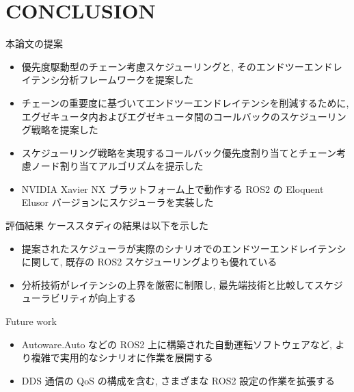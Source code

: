 
\section{CONCLUSION}
\label{sec: conslusion}

\begin{frame}{本論文の提案}
    \begin{itemize}
        \item 優先度駆動型のチェーン考慮スケジューリングと, そのエンドツーエンドレイテンシ分析フレームワークを提案した
        \item チェーンの重要度に基づいてエンドツーエンドレイテンシを削減するために, エグゼキュータ内およびエグゼキュータ間のコールバックのスケジューリング戦略を提案した
        \item スケジューリング戦略を実現するコールバック優先度割り当てとチェーン考慮ノード割り当てアルゴリズムを提示した
        \item NVIDIA Xavier NX プラットフォーム上で動作する ROS2 の Eloquent Elusor バージョンにスケジューラを実装した
    \end{itemize}
\end{frame}

\begin{frame}{評価結果}
    ケーススタディの結果は以下を示した
    \begin{itemize}
        \item 提案されたスケジューラが実際のシナリオでのエンドツーエンドレイテンシに関して, 既存の ROS2 スケジューリングよりも優れている
        \item 分析技術がレイテンシの上界を厳密に制限し, 最先端技術と比較してスケジューラビリティが向上する
    \end{itemize}
\end{frame}

\begin{frame}{Future work}
    \begin{itemize}
        \item Autoware.Auto などの ROS2 上に構築された自動運転ソフトウェアなど, より複雑で実用的なシナリオに作業を展開する
        \item DDS 通信の QoS の構成を含む, さまざまな ROS2 設定の作業を拡張する
    \end{itemize}
\end{frame}
